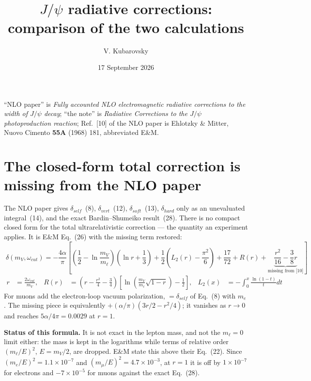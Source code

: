 \documentclass[11pt]{article}
\title{\vspace{-2em}$J/\psi$ radiative corrections:\\
comparison of the two calculations}
\author{V. Kubarovsky}
\date{17 September 2026}
\begin{document}
\maketitle
\vspace{-2.5em}

\noindent
``NLO paper'' is \emph{Fully accounted NLO electromagnetic radiative corrections
to the width of $J/\psi$ decay}; ``the note'' is \emph{Radiative Corrections to
the $J/\psi$ photoproduction reaction}; Ref.~[10] of the NLO paper is Ehlotzky
\& Mitter, Nuovo Cimento \textbf{55A} (1968) 181, abbreviated E\&M.

\section{The closed-form total correction is missing from the NLO paper}

The NLO paper gives $\delta_{self}$~(8), $\delta_{vert}$~(12),
$\delta_{soft}$~(13), $\delta_{hard}$ only as an unevaluated integral~(14), and
the exact Bardin--Shumeiko result~(28). There is no compact closed form for the
total ultrarelativistic correction --- the quantity an experiment applies. It is
E\&M Eq.~(26) with the missing term restored:
\begin{equation*}
\boxed{\;
\delta(m_V,\omega_{cut})=-\frac{4\alpha}{\pi}
\left[
\left(\frac12-\ln\frac{m_V}{m_\ell}\right)\left(\ln r+\frac13\right)
+\frac12\left(L_2(r)-\frac{\pi^{2}}{6}\right)
+\frac{17}{72}+R(r)
+\underbrace{\frac{r^{2}}{16}-\frac{3}{8}r}_{\text{missing from [10]}}
\right]\;}
\end{equation*}
\begin{align*}
r&=\frac{2\omega_{cut}}{m_V}, &
R(r)&=\left(r-\frac{r^{2}}{4}-\frac34\right)\left[\ln\!\left(\frac{m_V}{m_\ell}\sqrt{1-r}\right)-\frac12\right], &
L_2(x)&=-\int_0^x\frac{\ln(1-t)}{t}dt
\end{align*}
For muons add the electron-loop vacuum polarization, $=\delta_{self}$ of Eq.~(8)
with $m_e$. The missing piece is equivalently $+(\alpha/\pi)(3r/2-r^{2}/4)$; it
vanishes as $r\to0$ and reaches $5\alpha/4\pi=0.0029$ at $r=1$.

\textbf{Status of this formula.} It is not exact in the lepton mass, and not the
$m_\ell=0$ limit either: the mass is kept in the logarithms while terms of
relative order $(m_\ell/E)^{2}$, $E=m_V/2$, are dropped. E\&M state this above
their Eq.~(22). Since $(m_e/E)^{2}=1.1\times10^{-7}$ and
$(m_\mu/E)^{2}=4.7\times10^{-3}$, at $r=1$ it is off by $1\times10^{-7}$ for
electrons and $-7\times10^{-5}$ for muons against the exact Eq.~(28).
\end{document}
